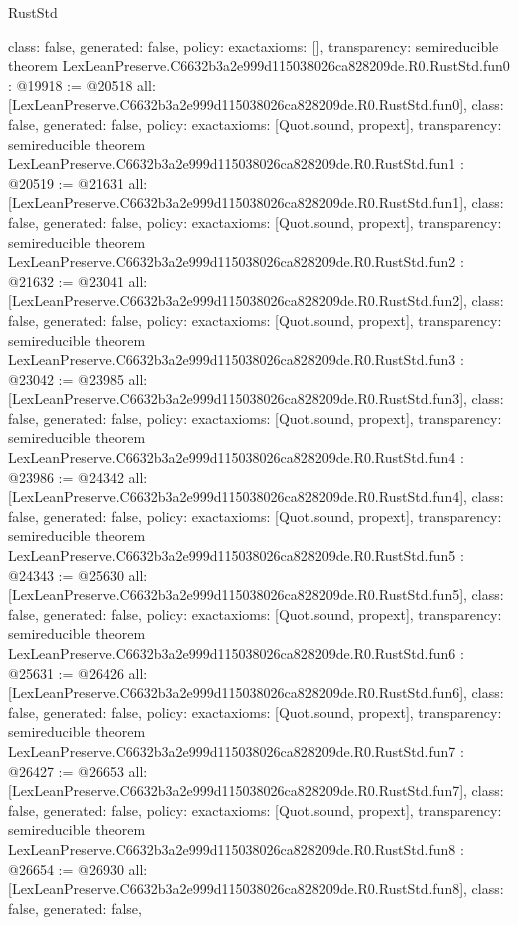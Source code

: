\begin{lexlean}{RustStd}
\begin{coremodule}
{  class: false,
  generated: false,
  policy: exact{axioms: []},
  transparency: semireducible
}
theorem LexLeanPreserve.C6632b3a2e999d115038026ca828209de.R0.RustStd.fun0 : @19918 := @20518 {
  all: [LexLeanPreserve.C6632b3a2e999d115038026ca828209de.R0.RustStd.fun0],
  class: false,
  generated: false,
  policy: exact{axioms: [Quot.sound, propext]},
  transparency: semireducible
}
theorem LexLeanPreserve.C6632b3a2e999d115038026ca828209de.R0.RustStd.fun1 : @20519 := @21631 {
  all: [LexLeanPreserve.C6632b3a2e999d115038026ca828209de.R0.RustStd.fun1],
  class: false,
  generated: false,
  policy: exact{axioms: [Quot.sound, propext]},
  transparency: semireducible
}
theorem LexLeanPreserve.C6632b3a2e999d115038026ca828209de.R0.RustStd.fun2 : @21632 := @23041 {
  all: [LexLeanPreserve.C6632b3a2e999d115038026ca828209de.R0.RustStd.fun2],
  class: false,
  generated: false,
  policy: exact{axioms: [Quot.sound, propext]},
  transparency: semireducible
}
theorem LexLeanPreserve.C6632b3a2e999d115038026ca828209de.R0.RustStd.fun3 : @23042 := @23985 {
  all: [LexLeanPreserve.C6632b3a2e999d115038026ca828209de.R0.RustStd.fun3],
  class: false,
  generated: false,
  policy: exact{axioms: [Quot.sound, propext]},
  transparency: semireducible
}
theorem LexLeanPreserve.C6632b3a2e999d115038026ca828209de.R0.RustStd.fun4 : @23986 := @24342 {
  all: [LexLeanPreserve.C6632b3a2e999d115038026ca828209de.R0.RustStd.fun4],
  class: false,
  generated: false,
  policy: exact{axioms: [Quot.sound, propext]},
  transparency: semireducible
}
theorem LexLeanPreserve.C6632b3a2e999d115038026ca828209de.R0.RustStd.fun5 : @24343 := @25630 {
  all: [LexLeanPreserve.C6632b3a2e999d115038026ca828209de.R0.RustStd.fun5],
  class: false,
  generated: false,
  policy: exact{axioms: [Quot.sound, propext]},
  transparency: semireducible
}
theorem LexLeanPreserve.C6632b3a2e999d115038026ca828209de.R0.RustStd.fun6 : @25631 := @26426 {
  all: [LexLeanPreserve.C6632b3a2e999d115038026ca828209de.R0.RustStd.fun6],
  class: false,
  generated: false,
  policy: exact{axioms: [Quot.sound, propext]},
  transparency: semireducible
}
theorem LexLeanPreserve.C6632b3a2e999d115038026ca828209de.R0.RustStd.fun7 : @26427 := @26653 {
  all: [LexLeanPreserve.C6632b3a2e999d115038026ca828209de.R0.RustStd.fun7],
  class: false,
  generated: false,
  policy: exact{axioms: [Quot.sound, propext]},
  transparency: semireducible
}
theorem LexLeanPreserve.C6632b3a2e999d115038026ca828209de.R0.RustStd.fun8 : @26654 := @26930 {
  all: [LexLeanPreserve.C6632b3a2e999d115038026ca828209de.R0.RustStd.fun8],
  class: false,
  generated: false,
}
\end{coremodule}
\end{lexlean}
